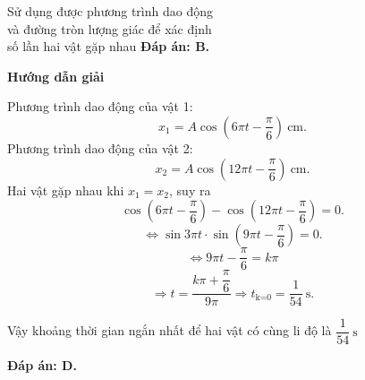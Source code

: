 \begin{dang}{Sử dụng được phương trình dao động\\ và đường tròn lượng giác để xác định\\ số lần hai vật gặp nhau}
{		\textbf{Đáp án: B.}
	}
	
	{\begin{center}
			\textbf{Hướng dẫn giải}
		\end{center}
		
		Phương trình dao động của vật 1:
		\begin{equation*}
			x_1 =A \cos \left(6\pi t -\dfrac{\pi}{6}\right)\ \text{cm}.
		\end{equation*}
		Phương trình dao động của vật 2:
		\begin{equation*}
			x_2 =A \cos \left(12\pi t -\dfrac{\pi}{6}\right)\ \text{cm}.
		\end{equation*}
		Hai vật gặp nhau khi $x_1=x_2$, suy ra
		\begin{equation*}
			\cos \left(6\pi t -\dfrac{\pi}{6}\right) - \cos \left(12\pi t -\dfrac{\pi}{6}\right) =0.
		\end{equation*}
		\begin{equation*}
			\Leftrightarrow \sin 3\pi t \cdot \sin \left(9\pi t -\dfrac{\pi}{6}\right) = 0.
		\end{equation*}
		\begin{equation*}
			\Leftrightarrow 9\pi t -\dfrac{\pi}{6} =k\pi
		\end{equation*}
		\begin{equation*}
			\Rightarrow t=\dfrac{k\pi + \dfrac{\pi}{6}}{9\pi}
			\Rightarrow t_\text{k=0} = \dfrac{1}{54}\ \text{s}.
		\end{equation*}
		
		Vậy khoảng thời gian ngắn nhất để hai vật có cùng li độ là $\dfrac{1}{54}\ \text{s}$
		
		\textbf{Đáp án: D.}
	}
\end{dang}